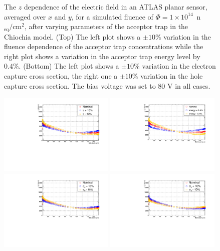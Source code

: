 \begin{figure}[htpb!]
\caption{The $z$ dependence of the electric field in an ATLAS planar sensor, averaged over $x$ and $y$, for a simulated
  fluence of $\Phi=1\times10^{14}$~n$_\text{eq}/\text{cm}^{2}$, after varying parameters of the acceptor trap in the Chiochia model. (Top) The left plot shows a $\pm 10\%$ variation in the fluence dependence of the acceptor trap concentrations while the right plot shows a variation in the acceptor trap energy level by $0.4\%$. 
  (Bottom) The left plot shows a $\pm 10\%$ variation in the electron capture cross section, the right one a $\pm 10\%$ variation in the hole capture cross section.
The bias voltage was set to $80$ V in all cases.}
\label{fig:acc_electricfieldvariations}
\end{figure}


\begin{figure}[htpb!]
\centering
\includegraphics[width=0.49\textwidth]{new_Detavariation.pdf}
\includegraphics[width=0.49\textwidth]{new_Denergyvariation.pdf}
\includegraphics[width=0.49\textwidth]{new_Dsigmaevariation.pdf}
\includegraphics[width=0.49\textwidth]{new_Dsigmahvariation.pdf}

\end{figure}
